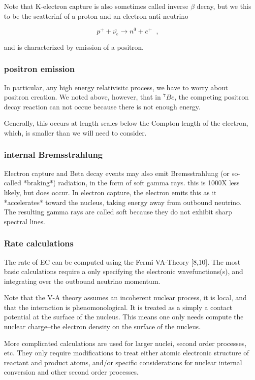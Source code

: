 \documentclass[11pt]{amsart}
\begin{document}
Note that K-electron capture is also sometimes called inverse $\beta$ decay, but we this to be the scatterinf of a proton and an electron anti-neutrino 

$$p^{+}+\bar{\nu_{e}} \rightarrow n^{0}+e^{+}\;\;,$$

and is characterized by emission of a positron. 

\subsubsection{positron emission}

In particular, any high energy relativisitc process, we have to worry about positron creation.  We noted above, however, that in $^{7}Be$, the competing positron decay reaction can not occue because there is not enough energy.    

Generally, this occurs at length scales below the Compton length of the electron, which, is smaller than we will need to consider.

\subsubsection{internal Bremsstrahlung}

Electron capture and Beta decay events may also emit Bremsstrahlung (or so-called *braking*) radiation, in the form of soft gamma rays. this is 1000X less likely, but does occur.  In electron capture, the electron emits this as it *accelerates* toward the nucleus, taking energy away from outbound neutrino.  The resulting gamma rays are called soft because they do not exhibit sharp spectral lines.  

\subsubsection{Rate calculations}

The rate of EC can be computed using the Fermi VA-Theory [8,10].  The most basic calculations require a only specifying the electronic wavefunctions(s), and integrating over the outbound neutrino momentum.  

Note that the V-A theory assumes an incoherent nuclear process, it is local, and that the interaction is phenomonological. It is treated as a simply a contact potential at the surface of the nucleus. This means one only needs compute the nuclear charge--the electron density on the surface of the nucleus.

More complicated calculations are used for larger nuclei, second order processes, etc. They only require modifications to treat either atomic electronic structure of reactant and product atoms, and/or specific considerations for nuclear internal conversion and other second order processes.
\end{document}
